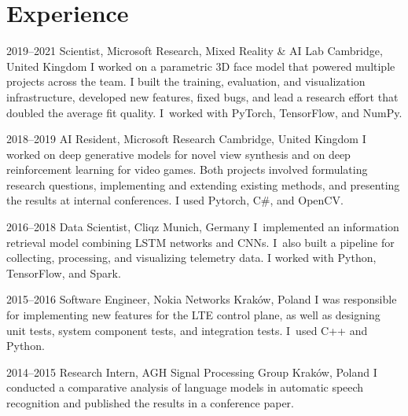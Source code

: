 \documentclass[]{friggeri-cv_osx}
\begin{document}
\vspace{5mm}
\begin{center}
\href{https://sebastiandziadzio.com}{\color{gray} \Large \faHome} \hspace{0.05cm}
\href{https://github.com/sebastiandziadzio}{\color{gray} \Large \faGithub} \hspace{0.05cm}
\href{https://twitter.com/sebadzia}{\color{gray} \Large\faTwitter} \hspace{0.05cm}
\href{https://pl.linkedin.com/in/sebastiandziadzio}{\color{gray} \Large\faLinkedin} \hspace{0.05cm}
\href{https://scholar.google.com/citations?user=8vAIQXoAAAAJ&hl=en}{\color{gray} \Large\faGraduationCap} \hspace{0.05cm}
\end{center}
\vspace{2mm}

\section{Experience}
\begin{entrylist}
\entry
{2019–2021}
{Scientist, Microsoft Research, Mixed Reality \& AI Lab}
{Cambridge, United Kingdom}
{I worked on a parametric 3D face model that powered multiple projects across the team. I built the training, evaluation, and visualization infrastructure, developed new features, fixed bugs,
and lead a research effort that doubled the average fit quality. I~worked with PyTorch, TensorFlow, and NumPy.\\}

\entry
{2018–2019}
{AI Resident, Microsoft Research}
{Cambridge, United Kingdom}
{I worked on deep generative models for novel view synthesis and on deep reinforcement learning for video games. Both projects involved
formulating research questions, implementing and extending existing methods, and presenting the results at internal conferences. I used Pytorch, C\#, and OpenCV.\\}

\entry
{2016–2018}
{Data Scientist, Cliqz}
{Munich, Germany}
{I~implemented an information retrieval model combining LSTM networks and CNNs. I~also built a pipeline for
collecting, processing, and visualizing telemetry data. I worked with Python, TensorFlow, and Spark.\\}

\entry
{2015–2016}
{Software Engineer, Nokia Networks}
{Kraków, Poland}
{I was responsible for implementing new features for the LTE control plane, as well as designing unit tests, system component tests,
and integration tests. I~used C++ and Python.\\}

\entry
{2014–2015}
{Research Intern, AGH Signal Processing Group}
{Kraków, Poland}
{I conducted a comparative analysis of language models in automatic speech recognition and published the results in a conference paper.\\}
\end{entrylist}
\end{document}
